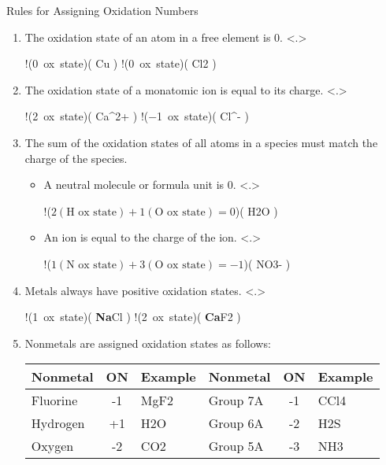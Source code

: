\documentclass[notes=hide]{beamer}
\begin{document}
\begin{frame}{Rules for Assigning Oxidation Numbers}
	\begin{enumerate}[<+->]
		\item The oxidation state of an atom in a free element
			is 0.
			\note<.>{
				\begin{reaction*}
					!(0~ox~state)( Cu ) 
					\qquad\qquad 
					!(0~ox~state)( Cl2 )
				\end{reaction*}
				}
		\item The oxidation state of a monatomic ion is equal to
			its charge.
			\note<.>{
				\begin{reaction*}
					!(\num{+2}~ox~state)( Ca^{2+} )
					\qquad\qquad
					!(\num{-1}~ox~state)( Cl^{-} )
				\end{reaction*}
				}
		\item The sum of the oxidation states of all atoms in a
			species must match the charge of the species.
			\begin{itemize}
				\item A neutral molecule or formula unit
					is 0.
					\note<.>{
						\begin{reaction*}
							!({$2 (\text{H~ox~state})
							+ 1 (\text{O~ox~state})
							= 0$})( H2O )
						\end{reaction*}
						}
				\item An ion is equal to the charge of
					the ion.
					\note<.>{
						\begin{reaction*}
							!({$1 (\text{N~ox~state})
							+ 3 (\text{O~ox~state})
							= -1$})( NO3- )
						\end{reaction*}
						}
			\end{itemize}
		\item Metals always have positive oxidation states.
			\note<.>{
				\begin{reaction*}
					!(\num{+1}~ox~state)(
					\textbf{\usebeamercolor[fg]{alerted
					text}Na}Cl )
					\qquad\qquad
					!(\num{+2}~ox~state)( \textbf{Ca}F2 )
				\end{reaction*}
				}
		\item Nonmetals are assigned oxidation states as follows:
			\begin{center}
				\small
				\begin{tabular} {l S e | l S e}
					\toprule
					\textbf{Nonmetal} & \textbf{ON} & \textbf{Example} &
					\textbf{Nonmetal} & \textbf{ON} & \textbf{Example} \\
					\midrule
					Fluorine & -1 & MgF2 & Group 7A & -1 & CCl4 \\
					Hydrogen & +1 & H2O  & Group 6A & -2 & H2S \\
					Oxygen & -2 & CO2    & Group 5A & -3 & NH3 \\
					\bottomrule
				\end{tabular}
			\end{center}
	\end{enumerate}
\end{frame}
\end{document}
